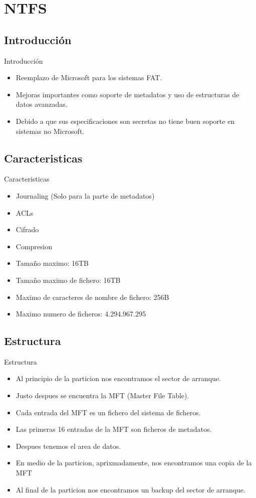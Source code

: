 \section{NTFS}
\subsection{Introducción}
\begin{frame}{Introducción}
  \begin{itemize}
    \item Reemplazo de Microsoft para los sistemas FAT.
    \item Mejoras importantes como soporte de metadatos y uso de estructuras de datos avanzadas.
    \item Debido a que sus especificaciones son secretas no tiene buen soporte en sistemas no Microsoft.
  \end{itemize}
\end{frame}

\subsection{Caracteristicas}
\begin{frame}{Caracteristicas}
  \begin{itemize}
    \item Journaling (Solo para la parte de metadatos)
    \item ACLs
    \item Cifrado
    \item Compresion
    \item Tamaño maximo: 16TB
    \item Tamaño maximo de fichero: 16TB
    \item Maximo de caracteres de nombre de fichero: 256B
    \item Maximo numero de ficheros: 4.294.967.295
  \end{itemize}
\end{frame}

\subsection{Estructura}
\begin{frame}{Estructura}
  \begin{itemize}
    \item Al principio de la particion nos encontramos el sector de arranque.
    \item Justo despues se encuentra la MFT (Master File Table).
    \item Cada entrada del MFT es un fichero del sistema de ficheros.
    \item Las primeras 16 entradas de la MFT son ficheros de metadatos.
    \item Despues tenemos el area de datos.
    \item En medio de la particion, aprixmadamente, nos encontramos una copia de la MFT
    \item Al final de la particion nos encontramos un backup del sector de arranque.
  \end{itemize}
\end{frame}


